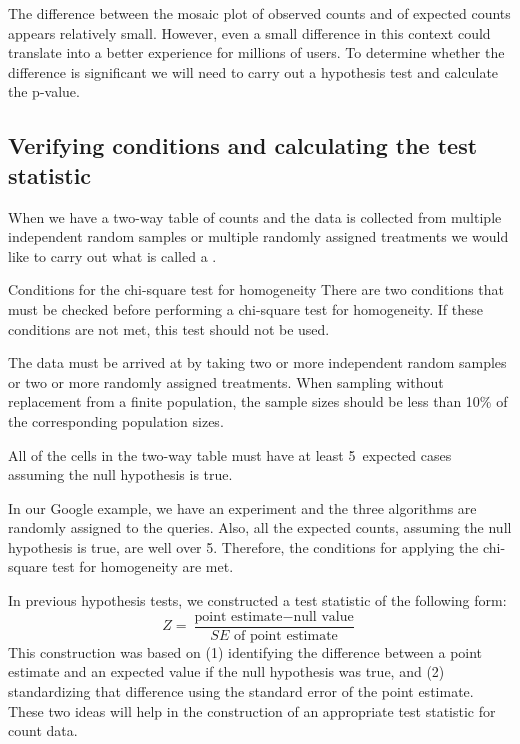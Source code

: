 The difference between the mosaic plot of observed counts and of expected counts appears relatively small.  However, even a small difference in this context could translate into a better experience for millions of users.  To determine whether the difference is significant we will need to carry out a hypothesis test and calculate the p-value.
\subsection{Verifying conditions and calculating the test statistic}


When we have a two-way table of counts and the data is collected from multiple independent random samples or multiple randomly assigned treatments we would like to carry out what is called a .

\begin{onebox}{Conditions for the chi-square test for homogeneity}
There are two conditions that must be checked before performing a chi-square test for homogeneity. If these conditions are not met, this test should not be used.\vspace{-1mm}
\begin{description}
\setlength{\itemsep}{0mm}
\item[Independence.] The data must be arrived at by taking two or more independent random samples or two or more randomly assigned treatments. When sampling without replacement from a finite population, the sample sizes should be less than 10\% of the corresponding population sizes.  
\item[Large expected counts.] All of the cells in the two-way table must have at least 5~expected cases assuming the null hypothesis is true.
\end{description}
\end{onebox}

\D{\newpage}

In our Google example, we have an experiment and the three algorithms are randomly assigned to the queries.  Also, all the expected counts, assuming the null hypothesis is true, are well over 5.  Therefore, the conditions for applying the chi-square test for homogeneity are met.  

In previous hypothesis tests, we constructed a test statistic of the following form:
$$ Z = \frac{\text{point estimate} - \text{null value}}{SE \text{ of point estimate}} $$
This construction was based on (1) identifying the difference between a point estimate and an expected value if the null hypothesis was true, and (2) standardizing that difference using the standard error of the point estimate. These two ideas will help in the construction of an appropriate test statistic for count data.


